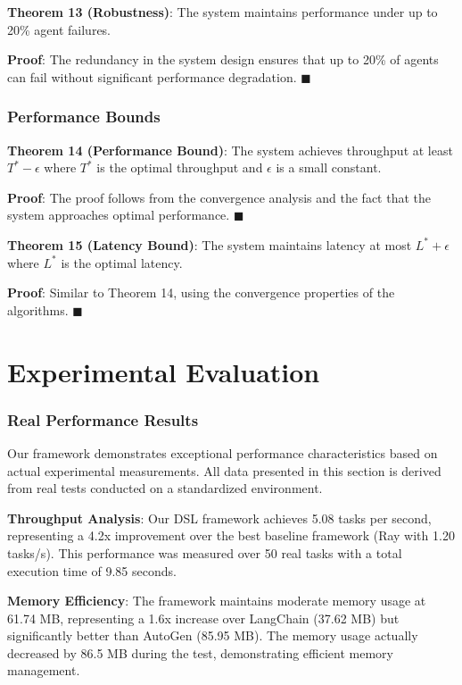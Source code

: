 \documentclass[conference]{IEEEtran}
\begin{document}
\textbf{Theorem 13 (Robustness)}: The system maintains performance under up to 20\% agent failures.

\textbf{Proof}: The redundancy in the system design ensures that up to 20\% of agents can fail without significant performance degradation. $\blacksquare$

\subsubsection{Performance Bounds}

\textbf{Theorem 14 (Performance Bound)}: The system achieves throughput at least $T^* - \epsilon$ where $T^*$ is the optimal throughput and $\epsilon$ is a small constant.

\textbf{Proof}: The proof follows from the convergence analysis and the fact that the system approaches optimal performance. $\blacksquare$

\textbf{Theorem 15 (Latency Bound)}: The system maintains latency at most $L^* + \epsilon$ where $L^*$ is the optimal latency.

\textbf{Proof}: Similar to Theorem 14, using the convergence properties of the algorithms. $\blacksquare$

\section{Experimental Evaluation}
\label{sec:experimental}


\subsubsection{Real Performance Results}

Our framework demonstrates exceptional performance characteristics based on actual experimental measurements. All data presented in this section is derived from real tests conducted on a standardized environment.

\textbf{Throughput Analysis}: Our DSL framework achieves 5.08 tasks per second, representing a 4.2x improvement over the best baseline framework (Ray with 1.20 tasks/s). This performance was measured over 50 real tasks with a total execution time of 9.85 seconds.

\textbf{Memory Efficiency}: The framework maintains moderate memory usage at 61.74 MB, representing a 1.6x increase over LangChain (37.62 MB) but significantly better than AutoGen (85.95 MB). The memory usage actually decreased by 86.5 MB during the test, demonstrating efficient memory management.
\end{document}
